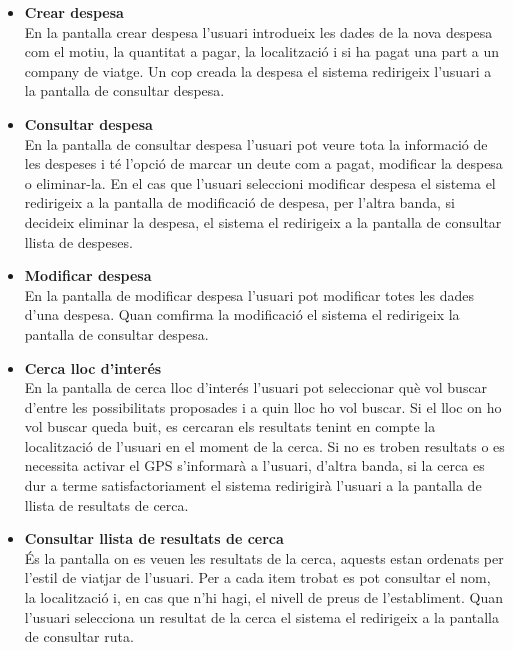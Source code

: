 \begin{itemize}
\item[]{\textbf{Crear despesa}}\\
En la pantalla crear despesa l'usuari introdueix les dades de la nova despesa com el motiu, la quantitat a pagar, la localització i si ha pagat una part a un company de viatge. Un cop creada la despesa el sistema redirigeix l'usuari a la pantalla de consultar despesa.\\

\item[]{\textbf{Consultar despesa}}\\
En la pantalla de consultar despesa l'usuari pot veure tota la informació de les despeses i té l'opció de marcar un deute com a pagat, modificar la despesa o eliminar-la. En el cas que l'usuari seleccioni modificar despesa el sistema el redirigeix a la pantalla de modificació de despesa, per l'altra banda, si decideix eliminar la despesa, el sistema el redirigeix a la pantalla de consultar llista de despeses.\\

\item[]{\textbf{Modificar despesa}}\\
En la pantalla de modificar despesa l'usuari pot modificar totes les dades d'una despesa. Quan comfirma la modificació el sistema el redirigeix la pantalla de consultar despesa.\\

\item[]{\textbf{Cerca lloc d'interés}}\\
En la pantalla de cerca lloc d'interés l'usuari pot seleccionar què vol buscar d'entre les possibilitats proposades i a quin lloc ho vol buscar. Si el lloc on ho vol buscar queda buit, es cercaran els resultats tenint en compte la localització de l'usuari en el moment de la cerca. Si no es troben resultats o es necessita activar el GPS s'informarà a l'usuari, d'altra banda, si la cerca es dur a terme satisfactoriament el sistema redirigirà l'usuari a la pantalla de llista de resultats de cerca.\\

\item[]{\textbf{Consultar llista de resultats de cerca}}\\
És la pantalla on es veuen les resultats de la cerca, aquests estan ordenats per l'estil de viatjar de l'usuari. Per a cada item trobat es pot consultar el nom, la localització i, en cas que n'hi hagi, el nivell de preus de l'establiment. Quan l'usuari selecciona un resultat de la cerca el sistema el redirigeix a la pantalla de consultar ruta.\\


\end{itemize}

